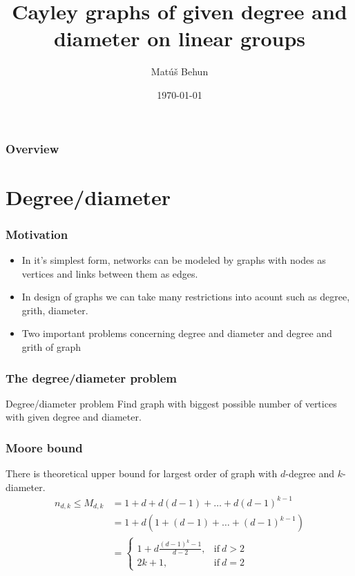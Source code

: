 \documentclass{beamer}
\title[]{Cayley graphs of given degree and diameter on linear groups} %
\author{Mat\'u\v{s} Behun} %
\institute[UCLA] %
{
Slovak University of Technology in Bratislava \\ %
\medskip
}
\date{\today} %
\begin{document}
\begin{frame}
\titlepage 
\end{frame}

\begin{frame}
\frametitle{Overview}
\tableofcontents
\end{frame}

\section{Degree/diameter} 

\begin{frame}
	\frametitle{Motivation}
\begin{itemize}
    \item In it's simplest form, networks can be modeled by graphs with nodes as vertices and links between them as edges.
	\item In design of graphs we can take many restrictions into acount such as degree, grith, diameter.
	\item Two important problems concerning degree and diameter and degree and grith of graph
\end{itemize}
\end{frame}
\begin{frame}
\frametitle{The degree/diameter problem}
	\begin{block}{Degree/diameter problem}
		Find graph with biggest possible number of vertices with given degree and diameter.
	\end{block}
\end{frame}
\begin{frame}
	\frametitle{Moore bound}
There is theoretical upper bound for largest order of graph with $d$-degree and $k$-diameter.
\begin{equation}\label{eq:Moore}
	\begin{split}
		n_{d,k} \leq M_{d,k}    & = 1 + d + d(d - 1) + \dots + d(d - 1)^{k-1}  \\
								& = 1 + d(1 + (d - 1) + \dots + (d - 1)^{k-1}) \\
                                & = \begin{cases}
                                        1+d\frac{(d-1)^{k}-1}{d-2}, & \text{if}\ d > 2 \\
                                    	2k+1, & \text{if}\ d=2
    								\end{cases}
    \end{split}
\end{equation}
\end{frame}
\end{document}
